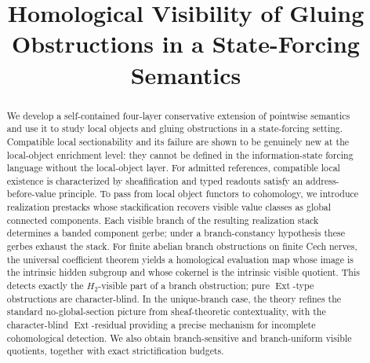 \documentclass[reqno]{amsart}
\title[Homological Visibility of Gluing Obstructions]{Homological Visibility of Gluing Obstructions in a State-Forcing Semantics}
\author{}
\theoremstyle{definition}
\theoremstyle{remark}
\begin{document}
\begin{abstract}
We develop a self-contained four-layer conservative extension of pointwise semantics and use it to study local objects and gluing obstructions in a state-forcing setting. Compatible local sectionability and its failure are shown to be genuinely new at the local-object enrichment level: they cannot be defined in the information-state forcing language without the local-object layer. For admitted references, compatible local existence is characterized by sheafification and typed readouts satisfy an address-before-value principle. To pass from local object functors to cohomology, we introduce realization prestacks whose stackification recovers visible value classes as global connected components. Each visible branch of the resulting realization stack determines a banded component gerbe; under a branch-constancy hypothesis these gerbes exhaust the stack. For finite abelian branch obstructions on finite Cech nerves, the universal coefficient theorem yields a homological evaluation map whose image is the intrinsic hidden subgroup and whose cokernel is the intrinsic visible quotient. This detects exactly the $H_2$-visible part of a branch obstruction; pure $\operatorname{Ext}$-type obstructions are character-blind. In the unique-branch case, the theory refines the standard no-global-section picture from sheaf-theoretic contextuality, with the character-blind $\operatorname{Ext}$-residual providing a precise mechanism for incomplete cohomological detection. We also obtain branch-sensitive and branch-uniform visible quotients, together with exact strictification budgets.
\end{abstract}


\maketitle














\end{document}

